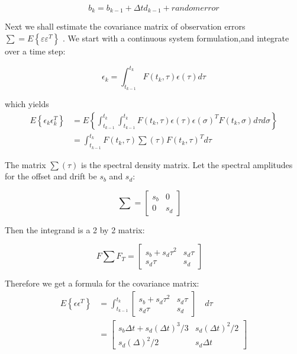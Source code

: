     \[ b_{k}=b_{k-1}+\Delta t d_{k-1}+random error \]
    
    Next we shall estimate the covariance matrix of observation errors $ \sum = E\left\lbrace \varepsilon \varepsilon^{T} \right\rbrace  $ . We start with a continuous system formulation,and integrate over a time step:
	
    \[ \epsilon_{k}=\int_{t_{k-1}}^{t_{k}}F(t_{k},\tau)\epsilon(\tau)d\tau \]	
	
	which yields
	\begin{equation*}
	\begin{aligned}
     E\left\lbrace \epsilon_{k} \epsilon_{k}^{T} \right\rbrace &=E\left\lbrace\int_{t_{k-1}}^{t_{k}}\int_{t_{k-1}}^{t_{k}} F(t_{k},\tau)\epsilon(\tau)\epsilon(\sigma)^{T}F(t_{k},\sigma)d\tau d\sigma \right\rbrace \\
     &= \int_{t_{k-1}}^{t_{k}} F(t_{k},\tau)\sum(\tau)F(t_{k},\tau)^{T}d\tau
	\end{aligned}
	\end{equation*}
 
	
	The matrix $\sum (\tau)$ is the spectral density matrix. Let the spectral amplitudes for the offset and drift be $ s_{b} $ and $ s_{d}$:
	
	\[ \sum = \begin{bmatrix} s_{b}&0  \\ 0&s_{d} \end{bmatrix} \quad \]
	
	Then the integrand is a 2 by 2 matrix: 
	
	\[ F\sum F_{T} = \begin{bmatrix} s_{b}+s_{d} \tau ^{2} & s_{d}\tau \\s_{d}\tau & s_{d} \end{bmatrix} \quad  \]
	
	Therefore we get a formula for the covariance matrix:
	\begin{equation}\label{5.28}
	\begin{aligned}
	E\left\lbrace\epsilon \epsilon^{T} \right\rbrace &=\int_{t_{k-1}}^{t_{k}} \begin{bmatrix}
	s_{b}+s_{d}\tau^{2}&s_{d}\tau\\s_{d}\tau&s_{d}
	\end{bmatrix}\quad d\tau\\
	&=\begin{bmatrix}
	s_{b}\Delta t+s_{d}(\Delta t)^{3}/3&s_{d}(\Delta t)^{2}/2\\s_{d}(\Delta)^{2}/2&s_{d}\Delta t
	\end{bmatrix}
	\end{aligned}
	\end{equation}
	 
